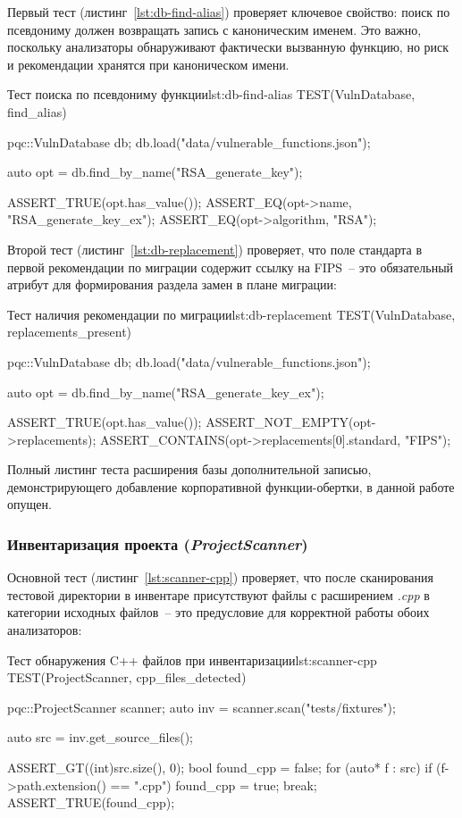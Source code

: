 \documentclass{itmo-vkr}
\newcommand{\code}[1]{\textit{#1}}
\begin{document}
Первый тест (листинг~\ref{lst:db-find-alias}) проверяет
ключевое свойство: поиск по псевдониму должен возвращать запись
с каноническим именем.
Это важно, поскольку анализаторы обнаруживают фактически вызванную
функцию, но риск и рекомендации хранятся при каноническом имени.

\begin{itmolisting}[C++]{Тест поиска по псевдониму функции}{lst:db-find-alias}
TEST(VulnDatabase, find_alias) {
    pqc::VulnDatabase db;
    db.load("data/vulnerable_functions.json");

    auto opt = db.find_by_name("RSA_generate_key");

    ASSERT_TRUE(opt.has_value());
    ASSERT_EQ(opt->name, "RSA_generate_key_ex");
    ASSERT_EQ(opt->algorithm, "RSA");
}
\end{itmolisting}

Второй тест (листинг~\ref{lst:db-replacement}) проверяет, что поле стандарта в первой рекомендации
по миграции содержит ссылку на FIPS~-- это обязательный атрибут
для формирования раздела замен в плане миграции:

\begin{itmolisting}[C++]{Тест наличия рекомендации по миграции}{lst:db-replacement}
TEST(VulnDatabase, replacements_present) {
    pqc::VulnDatabase db;
    db.load("data/vulnerable_functions.json");

    auto opt = db.find_by_name("RSA_generate_key_ex");

    ASSERT_TRUE(opt.has_value());
    ASSERT_NOT_EMPTY(opt->replacements);
    ASSERT_CONTAINS(opt->replacements[0].standard, "FIPS");
}
\end{itmolisting}

Полный листинг теста расширения базы дополнительной записью,
демонстрирующего добавление корпоративной функции-обертки, в данной работе опущен.

\subsubsection{Инвентаризация проекта (\code{ProjectScanner})}

Основной тест (листинг~\ref{lst:scanner-cpp}) проверяет, что после сканирования тестовой директории
в инвентаре присутствуют файлы с расширением \code{.cpp}
в категории исходных файлов~-- это предусловие
для корректной работы обоих анализаторов:

\begin{itmolisting}[C++]{Тест обнаружения C++ файлов при инвентаризации}{lst:scanner-cpp}
TEST(ProjectScanner, cpp_files_detected) {
    pqc::ProjectScanner scanner;
    auto inv = scanner.scan("tests/fixtures");

    auto src = inv.get_source_files();

    ASSERT_GT((int)src.size(), 0);
    bool found_cpp = false;
    for (auto* f : src)
        if (f->path.extension() == ".cpp") { found_cpp = true; break; }
    ASSERT_TRUE(found_cpp);
}
\end{itmolisting}
\end{document}
